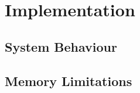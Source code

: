 
\chapter{Implementation} %

\label{Implementation} %


\section{System Behaviour}
\section{Memory Limitations}
